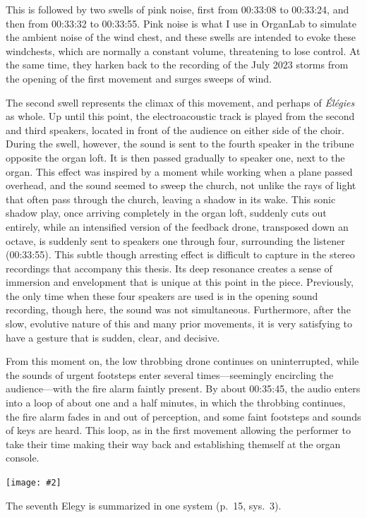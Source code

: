 \documentclass[12pt,twoside,maitrise]{dms_ks}
\newcommand{\customincludeexamples}[4][]{%
    \begin{example}[H]
        \centering
        \texttt{[image: \#2]}
        \caption{#4}
	\label{#3} 
    \end{example}
}
\theoremstyle{definition}
\begin{document}
{{This is followed by two swells of pink noise, first from 00:33:08 to 00:33:24, and then from 00:33:32 to 00:33:55.
Pink noise is what I use in OrganLab to simulate the ambient noise of the wind chest, and these swells are intended to evoke these windchests, which are normally a constant volume, threatening to lose control.
At the same time, they harken back to the recording of the July 2023 storms from the opening of the first movement and surges sweeps of wind.

The second swell represents the climax of this movement, and perhaps of \textit{Élégies} as whole.
Up until this point, the electroacoustic track is played from the second and third speakers, located in front of the audience on either side of the choir.
During the swell, however, the sound is sent to the fourth speaker in the tribune opposite the organ loft.
It is then passed gradually to speaker one, next to the organ.
This effect was inspired by a moment while working when a plane passed overhead, and the sound seemed to sweep the church, not unlike the rays of light that often pass through the church, leaving a shadow in its wake. 
This sonic shadow play, once arriving completely in the organ loft, suddenly cuts out entirely, while an intensified version of the feedback drone, transposed down an octave, is suddenly sent to speakers one through four, surrounding the listener (00:33:55).
This subtle though arresting effect is difficult to capture in the stereo recordings that accompany this thesis.
Its deep resonance creates a sense of immersion and envelopment that is unique at this point in the piece. 
Previously, the only time when these four speakers are used is in the opening sound recording, though here, the sound was not simultaneous. 
Furthermore, after the slow, evolutive nature of this and many prior movements, it is very satisfying to have a gesture that is sudden, clear, and decisive. 

From this moment on, the low throbbing drone continues on uninterrupted, while the sounds of urgent footsteps enter several times---seemingly encircling the audience---with the fire alarm faintly present. 
By about 00:35:45, the audio enters into a loop of about one and a half minutes, in which the throbbing continues, the fire alarm fades in and out of perception, and some faint footsteps and sounds of keys are heard.  
This loop, as in the first movement allowing the performer to take their time making their way back and establishing themself at the organ console.

\customincludeexamples[width=\textwidth]{7e_1}{ex:7e_1}{The seventh Elegy is summarized in one system (p.~15, sys.~3).}

}}
\end{document}
